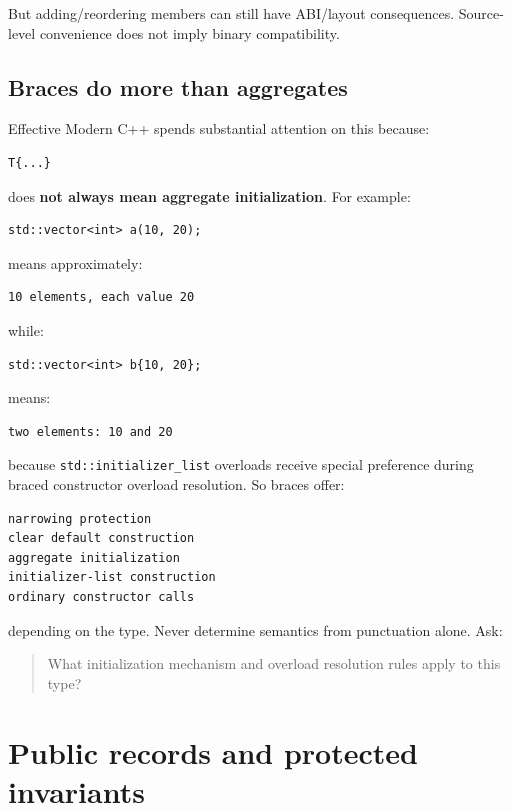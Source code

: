 But adding/reordering members can still have ABI/layout consequences. Source-level convenience does not imply binary compatibility.

\subsection{Braces do more than aggregates}\label{05-engine-i-ch003-braces-do-more-than-aggregates}

Effective Modern C++ spends substantial attention on this because:

\begin{verbatim}
T{...}
\end{verbatim}

does \textbf{not always mean aggregate initialization}. For example:

\begin{verbatim}
std::vector<int> a(10, 20);
\end{verbatim}

means approximately:

\begin{verbatim}
10 elements, each value 20
\end{verbatim}

while:

\begin{verbatim}
std::vector<int> b{10, 20};
\end{verbatim}

means:

\begin{verbatim}
two elements: 10 and 20
\end{verbatim}

because \texttt{std::initializer\_list} overloads receive special preference during braced constructor overload resolution. So braces offer:

\begin{verbatim}
narrowing protection
clear default construction
aggregate initialization
initializer-list construction
ordinary constructor calls
\end{verbatim}

depending on the type. Never determine semantics from punctuation alone. Ask:

\begin{quote}
What initialization mechanism and overload resolution rules apply to this type?
\end{quote}

\section{Public records and protected invariants}\label{05-engine-i-ch003-public-records-and-protected-invariants}

